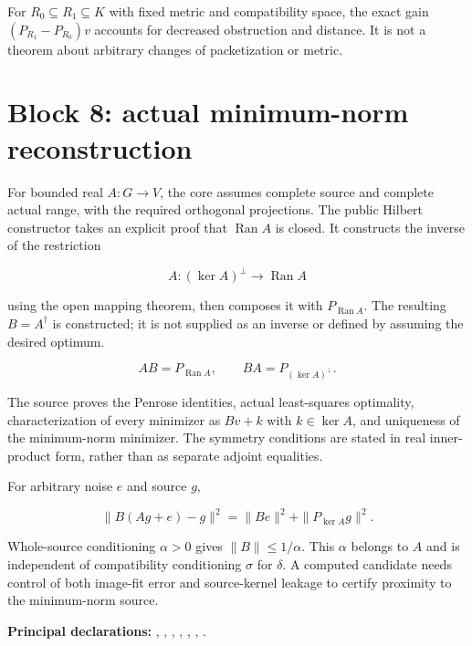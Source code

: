 \documentclass[11pt]{article}
\begin{document}
For \(R_0\subseteq R_1\subseteq K\) with fixed metric and compatibility
space, the exact gain \((P_{R_1}-P_{R_0})v\) accounts for decreased
obstruction and distance. It is not a theorem about arbitrary changes of
packetization or metric.

\hypertarget{block-8-actual-minimum-norm-reconstruction}{%
\section{Block 8: actual minimum-norm
reconstruction}\label{block-8-actual-minimum-norm-reconstruction}}

For bounded real \(A:G\to V\), the core assumes complete source and
complete actual range, with the required orthogonal projections. The
public Hilbert constructor takes an explicit proof that
\(\operatorname{Ran}A\) is closed. It constructs the inverse of the
restriction

\[
A:(\ker A)^\perp\longrightarrow\operatorname{Ran}A
\]

using the open mapping theorem, then composes it with
\(P_{\operatorname{Ran}A}\). The resulting \(B=A^\dagger\) is
constructed; it is not supplied as an inverse or defined by assuming the
desired optimum.

\[
AB=P_{\operatorname{Ran}A},\qquad BA=P_{(\ker A)^\perp}.
\]

The source proves the Penrose identities, actual least-squares
optimality, characterization of every minimizer as \(Bv+k\) with
\(k\in\ker A\), and uniqueness of the minimum-norm minimizer. The
symmetry conditions are stated in real inner-product form, rather than
as separate adjoint equalities.

For arbitrary noise \(e\) and source \(g\),

\[
\|B(Ag+e)-g\|^2=\|Be\|^2+\|P_{\ker A}g\|^2.
\]

Whole-source conditioning \(\alpha>0\) gives \(\|B\|\le1/\alpha\). This
\(\alpha\) belongs to \(A\) and is independent of compatibility
conditioning \(\sigma\) for \(\delta\). A computed candidate needs
control of both image-fit error and source-kernel leakage to certify
proximity to the minimum-norm source.

\textbf{Principal declarations:}
\texttt{},
\texttt{},
\texttt{},
\texttt{},
\texttt{},
\texttt{},
\texttt{}.
\end{document}
